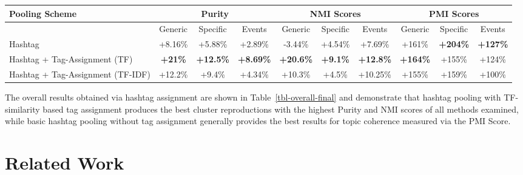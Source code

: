 \documentclass{sig-alternate}
\begin{document}
\begin{table*}[t!]
\caption{ Overall percentage improvement over unpooled scheme.}\label{tbl-overall-final}
\centering
\resizebox{18cm}{!} 
{
        \begin{tabular}{|l|ccc|ccc|ccc|}
        \hline
        Pooling Scheme  & \multicolumn {3}{c}{Purity} & \multicolumn {3}{c}{NMI Scores} & \multicolumn {3}{c|}{PMI Scores}\\
        \hline
         & Generic & Specific & Events &  Generic & Specific & Events &  Generic & Specific & Events\\
        \hline
        Hashtag & +8.16\% & +5.88\% & +2.89\% & -3.44\% & +4.54\% & +7.69\% & +161\% & \textbf{+204\%} & \textbf{+127\%} \\
        \hline
        Hashtag + Tag-Assignment (TF) & \textbf{+21\%} & \textbf{+12.5\%} & \textbf{+8.69\%} & \textbf{+20.6\%} & \textbf{+9.1\%} & \textbf{+12.8\%} & \textbf{+164\%} & +155\% & +124\% \\
        \hline
        Hashtag + Tag-Assignment (TF-IDF) & +12.2\% & +9.4\% & +4.34\% & +10.3\% & +4.5\% & +10.25\% & +155\% & +159\% & +100\% \\
        \hline
        \end{tabular}
}
\end{table*}

The overall results obtained via hashtag assignment are shown in
Table~\ref{tbl-overall-final} and demonstrate that hashtag pooling
with TF-similarity based tag assignment produces the best cluster
reproductions with the highest Purity and NMI scores of all methods
examined, while basic hashtag pooling without tag assignment generally
provides the best results for topic coherence measured via the PMI
Score.


\section{Related Work}
\end{document}
